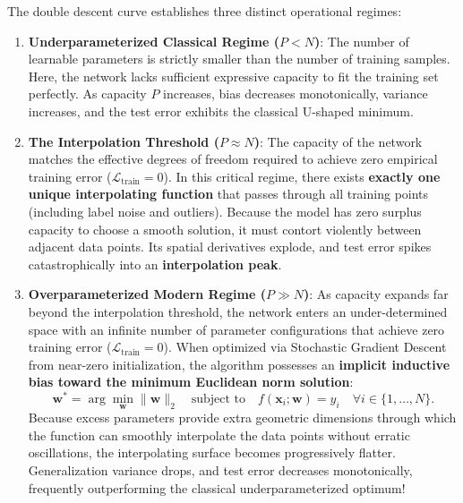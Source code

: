 The double descent curve establishes three distinct operational regimes:
\begin{enumerate}[leftmargin=*]
  \item \textbf{Underparameterized Classical Regime ($P < N$)}:
    The number of learnable parameters is strictly smaller than the number of training samples. Here, the network lacks sufficient expressive capacity to fit the training set perfectly. As capacity $P$ increases, bias decreases monotonically, variance increases, and the test error exhibits the classical U-shaped minimum.
  \item \textbf{The Interpolation Threshold ($P \approx N$)}:
    The capacity of the network matches the effective degrees of freedom required to achieve zero empirical training error ($\mathcal{L}_{\text{train}} = 0$). In this critical regime, there exists \textbf{exactly one unique interpolating function} that passes through all training points (including label noise and outliers). Because the model has zero surplus capacity to choose a smooth solution, it must contort violently between adjacent data points. Its spatial derivatives explode, and test error spikes catastrophically into an \textbf{interpolation peak}.
  \item \textbf{Overparameterized Modern Regime ($P \gg N$)}:
    As capacity expands far beyond the interpolation threshold, the network enters an under-determined space with an infinite number of parameter configurations that achieve zero training error ($\mathcal{L}_{\text{train}} = 0$). When optimized via Stochastic Gradient Descent from near-zero initialization, the algorithm possesses an \textbf{implicit inductive bias toward the minimum Euclidean norm solution}:
    \begin{equation}
    \mathbf{w}^* = \arg\min_{\mathbf{w}} \|\mathbf{w}\|_2 \quad \text{subject to} \quad f(\mathbf{x}_i; \mathbf{w}) = y_i \quad \forall i \in \{1, \dots, N\}.
    \end{equation}
    Because excess parameters provide extra geometric dimensions through which the function can smoothly interpolate the data points without erratic oscillations, the interpolating surface becomes progressively flatter. Generalization variance drops, and test error decreases monotonically, frequently outperforming the classical underparameterized optimum!
\end{enumerate}

